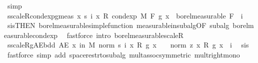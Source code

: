 \begin{isabellebody}
\ simp\isanewline
\ \ \ \ \ \ \isamarkupfalse%
\ s{\isacharunderscore}{\kern0pt}scaleR{\isacharunderscore}{\kern0pt}cond{\isacharunderscore}{\kern0pt}exp{\isacharunderscore}{\kern0pt}g{\isacharunderscore}{\kern0pt}meas{\isacharcolon}{\kern0pt}\ {\isachardoublequoteopen}{\isacharparenleft}{\kern0pt}{\isasymlambda}x{\isachardot}{\kern0pt}\ s\ i\ x\ {\isacharasterisk}{\kern0pt}\isactrlsub R\ cond{\isacharunderscore}{\kern0pt}exp\ M\ F\ g\ x{\isacharparenright}{\kern0pt}\ {\isasymin}\ borel{\isacharunderscore}{\kern0pt}measurable\ {\isacharquery}{\kern0pt}F{\isachardoublequoteclose}\ \ i\ \isamarkupfalse%
\ s{\isacharunderscore}{\kern0pt}is{\isacharparenleft}{\kern0pt}{}{\isacharparenright}{\kern0pt}{\isacharbrackleft}{\kern0pt}THEN\ borel{\isacharunderscore}{\kern0pt}measurable{\isacharunderscore}{\kern0pt}simple{\isacharunderscore}{\kern0pt}function{\isacharbrackright}{\kern0pt}\ measurable{\isacharunderscore}{\kern0pt}in{\isacharunderscore}{\kern0pt}subalg{\isacharbrackleft}{\kern0pt}OF\ subalg\ borel{\isacharunderscore}{\kern0pt}measurable{\isacharunderscore}{\kern0pt}cond{\isacharunderscore}{\kern0pt}exp{\isacharbrackright}{\kern0pt}\ \isamarkupfalse%
\ {\isacharparenleft}{\kern0pt}fastforce\ intro{\isacharcolon}{\kern0pt}\ borel{\isacharunderscore}{\kern0pt}measurable{\isacharunderscore}{\kern0pt}scaleR{\isacharparenright}{\kern0pt}\isanewline
\isanewline
\ \ \ \ \ \ \isamarkupfalse%
\ s{\isacharunderscore}{\kern0pt}scaleR{\isacharunderscore}{\kern0pt}g{\isacharunderscore}{\kern0pt}AE{\isacharunderscore}{\kern0pt}bdd{\isacharcolon}{\kern0pt}\ {\isachardoublequoteopen}AE\ x\ in\ M{\isachardot}{\kern0pt}\ norm\ {\isacharparenleft}{\kern0pt}s\ i\ x\ {\isacharasterisk}{\kern0pt}\isactrlsub R\ g\ x{\isacharparenright}{\kern0pt}\ {\isasymle}\ {}\ {\isacharasterisk}{\kern0pt}\ norm\ {\isacharparenleft}{\kern0pt}z\ x\ {\isacharasterisk}{\kern0pt}\isactrlsub R\ g\ x{\isacharparenright}{\kern0pt}{\isachardoublequoteclose}\ \ i\ \isamarkupfalse%
\ s{\isacharunderscore}{\kern0pt}is{\isacharparenleft}{\kern0pt}{}{\isacharparenright}{\kern0pt}\ \isamarkupfalse%
\ {\isacharparenleft}{\kern0pt}fastforce\ simp\ add{\isacharcolon}{\kern0pt}\ space{\isacharunderscore}{\kern0pt}restr{\isacharunderscore}{\kern0pt}to{\isacharunderscore}{\kern0pt}subalg\ mult{\isachardot}{\kern0pt}assoc{\isacharbrackleft}{\kern0pt}symmetric{\isacharbrackright}{\kern0pt}\ mult{\isacharunderscore}{\kern0pt}right{\isacharunderscore}{\kern0pt}mono{\isacharparenright}{\kern0pt}\isanewline

\end{isabellebody}
